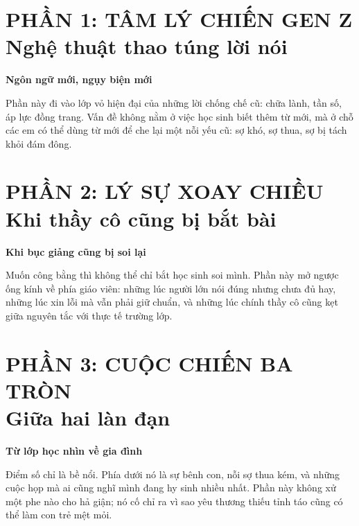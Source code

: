 \documentclass[14pt,a4paper,twoside]{extbook}
\newcommand{\partintro}[2]{%
  \begin{center}
    \begin{minipage}{0.86\textwidth}
    \begin{tcolorbox}[
      colback=bookbg,
      colframe=booksecondary,
      boxrule=0.8pt,
      arc=4pt,
      enhanced,
      left=8pt,right=8pt,top=8pt,bottom=8pt
    ]
    {\centering\bfseries\color{bookprimary}#1\par}
    \vspace{5pt}
    {\small #2}
    \end{tcolorbox}
    \end{minipage}
  \end{center}
  \vspace{8pt}
}
\begin{document}






\frontmatter
\tableofcontents
\clearpage


\mainmatter

\part*{PHẦN 1: TÂM LÝ CHIẾN GEN Z\\\large Nghệ thuật thao túng lời nói}
\partintro{Ngôn ngữ mới, ngụy biện mới}{Phần này đi vào lớp vỏ hiện đại của những lời chống chế cũ: chữa lành, tần số, áp lực đồng trang. Vấn đề không nằm ở việc học sinh biết thêm từ mới, mà ở chỗ các em có thể dùng từ mới để che lại một nỗi yếu cũ: sợ khó, sợ thua, sợ bị tách khỏi đám đông.}




\part*{PHẦN 2: LÝ SỰ XOAY CHIỀU\\\large Khi thầy cô cũng bị bắt bài}
\partintro{Khi bục giảng cũng bị soi lại}{Muốn công bằng thì không thể chỉ bắt học sinh soi mình. Phần này mở ngược ống kính về phía giáo viên: những lúc người lớn nói đúng nhưng chưa đủ hay, những lúc xin lỗi mà vẫn phải giữ chuẩn, và những lúc chính thầy cô cũng kẹt giữa nguyên tắc với thực tế trường lớp.}




\part*{PHẦN 3: CUỘC CHIẾN BA TRÒN\\\large Giữa hai làn đạn}
\partintro{Từ lớp học nhìn về gia đình}{Điểm số chỉ là bề nổi. Phía dưới nó là sự bênh con, nỗi sợ thua kém, và những cuộc họp mà ai cũng nghĩ mình đang hy sinh nhiều nhất. Phần này không xử một phe nào cho hả giận; nó cố chỉ ra vì sao yêu thương thiếu tỉnh táo cũng có thể làm con trẻ mệt mỏi.}



\end{document}
